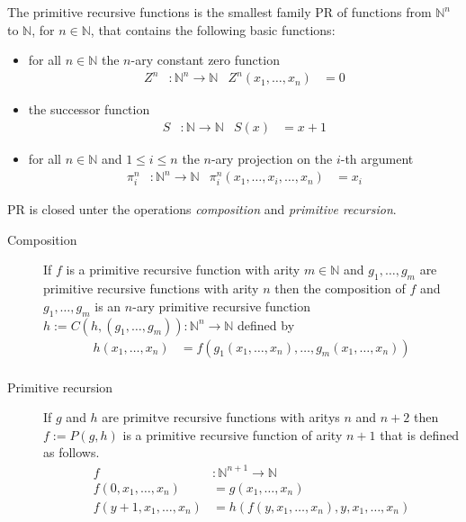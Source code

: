 \documentclass{jfp}
\newcommand{\xn}{x_1,\dots,x_n }
\begin{document}
The primitive recursive functions is the smallest family PR of functions
from ${ℕ}^n$  to ${ℕ}$, for $n\in {ℕ}$, that contains the following
basic functions:
\begin{itemize}
\item for all $n\in {ℕ}$ the $n$-ary constant zero function
  \begin{align*}
	Z^n  &\colon \mathbb{N}^n \rightarrow \mathbb{N}  &
	Z^n    (\xn) &= 0  
  \end{align*}
\item the successor function
  \begin{align*}
	S &\colon \mathbb{N} \rightarrow \mathbb{N} &
	S  (x)  &=  x + 1
  \end{align*}
\item for all $n\in {ℕ}$ and $1\le i\le n$ the $n$-ary projection on
  the $i$-th argument
\begin{align*}
	\pi^{n}_{i} &\colon \mathbb{N}^n \rightarrow \mathbb{N} &
	\pi^{n}_{i}  (x_1,\dots,x_i,\dots,x_n)  &= x_i
\end{align*}
\end{itemize}
PR is closed unter the operations \emph{composition} and \emph{primitive recursion}.
\begin{description}
\item[Composition] 
If $f$ is a primitive recursive function with arity $m \in {ℕ}$ and $g_1,
\dots, g_m$ are primitive recursive functions with arity $n$ then the
composition of $f$ and $g_1, \dots, g_m$ is an $n$-ary primitive recursive function
$h := C (h,(g_1,\dots, g_m)) \colon \mathbb{N}^n \rightarrow \mathbb{N} $ defined by
\begin{align*}
	h  (\xn)  &= f (g_1(\xn),\dots,g_m(\xn)) \\
\end{align*}

\item[Primitive recursion] 
If $g$ and $h$ are primitve recursive functions with aritys $n$ and
$n+2$ then $f := P (g,h)$ is a primitive recursive function of arity $n+1$ that is defined as follows.
\begin{align*}
	f&\colon \mathbb{N}^{n+1} \rightarrow \mathbb{N} \\
	f  (0,\xn)  &= g (\xn) \\
	f  (y + 1,\xn) &= h(  f(y,\xn),y,\xn)
\end{align*}

\end{description}

 
\end{document}
